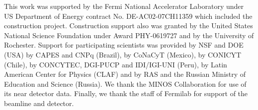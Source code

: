 \begin{acknowledgments}

This work was supported by the Fermi National Accelerator Laboratory
under US Department of Energy contract
No. DE-AC02-07CH11359 which included the \minerva construction project.
Construction support also
was granted by the United States National Science Foundation under
Award PHY-0619727 and by the University of Rochester. Support for
participating scientists was provided by NSF and DOE (USA) by CAPES
and CNPq (Brazil), by CoNaCyT (Mexico), by CONICYT (Chile), by
CONCYTEC, DGI-PUCP and IDI/IGI-UNI (Peru), by Latin American Center for
Physics (CLAF) and by RAS and the Russian Ministry of Education and Science (Russia).  We
thank the MINOS Collaboration for use of its
near detector data. Finally, we thank the staff of
Fermilab for support of the beamline and detector.

\end{acknowledgments}
